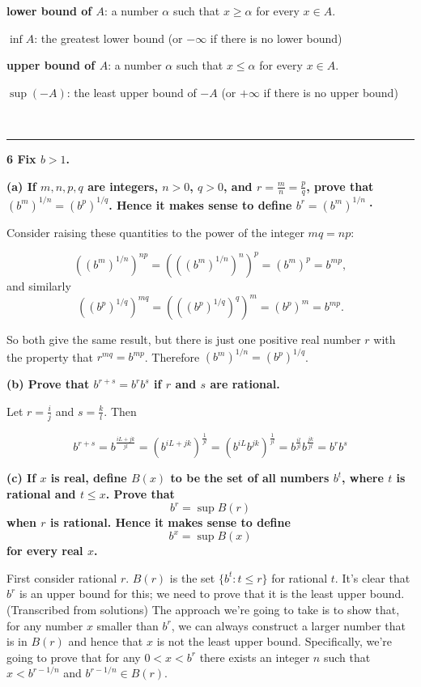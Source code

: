 \textbf{lower bound of $A$}: a number $\alpha$ such that $x \geq \alpha$ for every $x \in A$.

\textbf{$\inf A$}: the greatest lower bound (or $-\infty$ if there is no lower bound)

\textbf{upper bound of $A$}: a number $\alpha$ such that $x \leq \alpha$ for every $x \in A$.

\textbf{$\sup(-A)$}: the least upper bound of $-A$ (or $+\infty$ if there is no upper bound)

~\\\hrule
\textbf{6 Fix $b > 1$.}

\textbf{
(a) If $m,n,p,q$ are integers, $n>0$, $q>0$, and $r=\frac{m}{n}=\frac{p}{q}$,
prove that $(b^m)^{1/n} = (b^p)^{1/q}$. Hence it makes sense to define $b^r =
(b^m)^{1/n}$·}

Consider raising these quantities to the power of the integer $mq = np$:

$$
((b^m)^{1/n})^{np} = (((b^m)^{1/n})^{n})^p = (b^m)^p = b^{mp},
$$
and similarly
$$
((b^p)^{1/q})^{mq} = (((b^p)^{1/q})^{q})^m = (b^p)^m = b^{mp}.
$$

So both give the same result, but there is just one positive real number $r$
with the property that $r^{mq} = b^{mp}$. Therefore $(b^m)^{1/n} =
(b^p)^{1/q}$.

\textbf{
(b) Prove that $b^{r+s} = b^rb^s$ if $r$ and $s$ are rational.
}

Let $r=\frac{i}{j}$ and $s=\frac{k}{l}$. Then

$$
b^{r+s} =
b^\frac{iL + jk}{jl} =
(b^{iL + jk})^\frac{1}{jl} =
(b^{iL}b^{jk})^\frac{1}{jl} =
b^\frac{il}{jl}b^\frac{jk}{jl} =
b^{r}b^{s}
$$

\textbf{(c) If $x$ is real, define $B(x)$ to be the set of all numbers $b^t$, where
$t$ is rational and $t \leq x$. Prove that $$b^r = \sup B(r)$$ when $r$ is
rational. Hence it makes sense to define $$b^x = \sup B(x)$$ for every real $x$.
}

First consider rational $r$. $B(r)$ is the set $\{b^t: t \leq r\}$ for rational
$t$. It's clear that $b^r$ is an upper bound for this; we need to prove that it
is the least upper bound. (Transcribed from solutions) The approach we're going
to take is to show that, for any number $x$ smaller than $b^r$, we can always
construct a larger number that is in $B(r)$ and hence that $x$ is not the least
upper bound. Specifically, we're going to prove that for any $0 < x < b^r$
there exists an integer $n$ such that $x < b^{r - 1/n}$ and $b^{r - 1/n} \in
B(r)$.

